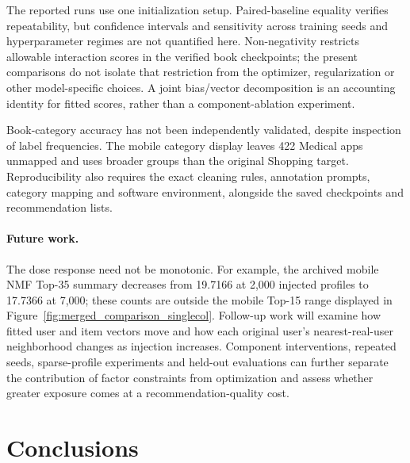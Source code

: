 \documentclass[information,article,submit,pdftex,moreauthors]{Definitions/mdpi}
\newif\ifrevisionnotes
\newcommand{\saracomment}[1]{\ifrevisionnotes\par\smallskip\noindent\textcolor{orange}{\textbf{Sara:} #1}\par\smallskip\fi}
\begin{document}
The reported runs use one initialization setup. Paired-baseline equality verifies repeatability, but confidence intervals and sensitivity across training seeds and hyperparameter regimes are not quantified here. Non-negativity restricts allowable interaction scores in the verified book checkpoints; the present comparisons do not isolate that restriction from the optimizer, regularization or other model-specific choices. A joint bias/vector decomposition is an accounting identity for fitted scores, rather than a component-ablation experiment.

Book-category accuracy has not been independently validated, despite inspection of label frequencies. The mobile category display leaves 422 Medical apps unmapped and uses broader groups than the original Shopping target. Reproducibility also requires the exact cleaning rules, annotation prompts, category mapping and software environment, alongside the saved checkpoints and recommendation lists.

\paragraph{Future work.}
The dose response need not be monotonic. For example, the archived mobile NMF Top-35 summary decreases from 19.7166 at 2,000 injected profiles to 17.7366 at 7,000; these counts are outside the mobile Top-15 range displayed in Figure~\ref{fig:merged_comparison_singlecol}. Follow-up work will examine how fitted user and item vectors move and how each original user's nearest-real-user neighborhood changes as injection increases. Component interventions, repeated seeds, sparse-profile experiments and held-out evaluations can further separate the contribution of factor constraints from optimization and assess whether greater exposure comes at a recommendation-quality cost.

\saracomment{Updated Discussion and Conclusions to reflect the new all-ratings, synthetic-only and unread-book analyses. Distinguished training fit from exposure, a score accounting from a causal ablation, and repeatability from cross-seed uncertainty. Retained the higher-dose mobile non-monotonic example explicitly as an archived result outside the main displayed range. The planned vector-space and neighbor analyses remain future work.}

\section{Conclusions}
\label{sec:conclusion}
\end{document}
